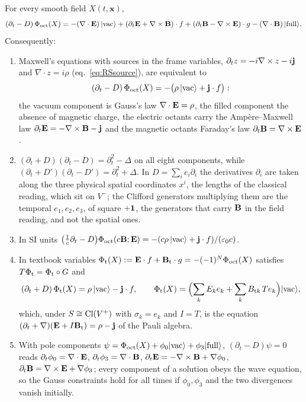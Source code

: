 \begin{theorem}
\label{r3:thm:maxwell}
For every smooth field $X(t,\mathbf x)$,
\begin{equation}
\label{r3:eq:maxwell}
(\partial_t-D)\,\Phi_{\rm oct}(X)=-(\nabla\cdot\mathbf E)\,|\mathrm{vac}\rangle+(\partial_t\mathbf E+\nabla\times\mathbf B)\cdot f+(\partial_t\mathbf B-\nabla\times\mathbf E)\cdot g-(\nabla\cdot\mathbf B)\,|\mathrm{full}\rangle .
\end{equation}
Consequently:
\begin{enumerate}[label=(\roman*),leftmargin=2.2em]
\item Maxwell's equations with sources in the frame variables, $\partial_tz=-i\nabla\times z-i\mathbf j$ and $\nabla\cdot z=i\rho$ (eq.~\cref{eq:RSsource}), are equivalent to
\[
(\partial_t-D)\,\Phi_{\rm oct}(X)=-\bigl(\rho\,|\mathrm{vac}\rangle+\mathbf j\cdot f\bigr):
\]
the vacuum component is Gauss's law $\nabla\cdot\mathbf E=\rho$, the filled component the absence of magnetic charge, the electric octants carry the
Amp\`ere--Maxwell law $\partial_t\mathbf E=-\nabla\times\mathbf B-\mathbf j$ and the magnetic octants Faraday's law $\partial_t\mathbf B=\nabla\times\mathbf E$.
\item $(\partial_t+D)(\partial_t-D)=\partial_t^2-\Delta$ on all eight components, while $(\partial_t+D')(\partial_t-D')=\partial_t^2+\Delta$. In $D=\sum_ie_i\partial_i$ the
derivatives $\partial_i$ are taken along the three physical spatial coordinates $x^i$, the lengths of the classical reading, which sit on $V^-$;
the Clifford generators multiplying them are the temporal $e_1,e_2,e_3$, of square $+\mathbf 1$, the generators that carry $\mathbf B$ in the field reading,
and not the spatial ones.
\item In SI units $\bigl(\tfrac1c\partial_t-D\bigr)\Phi_{\rm oct}(c\mathbf B;\mathbf E)=-(c\rho\,|\mathrm{vac}\rangle+\mathbf j\cdot f)/(\varepsilon_0c)$.
\item In textbook variables $\Phi_{\rm t}(X):=\mathbf E\cdot f+\mathbf B_{\rm t}\cdot g=-(-1)^N\Phi_{\rm oct}(X)$ satisfies $T\Phi_{\rm t}=\Phi_{\rm t}\circ G$ and
\[
(\partial_t+D)\,\Phi_{\rm t}(X)=\rho\,|\mathrm{vac}\rangle-\mathbf j\cdot f,\qquad \Phi_{\rm t}(X)=\Bigl(\sum_kE_ke_k+\sum_kB_{{\rm t}k}\,Te_k\Bigr)|\mathrm{vac}\rangle ,
\]
which, under $S\cong\mathrm{Cl}(V^+)$ with $\sigma_k=e_k$ and $I=T$, is the equation $(\partial_t+\nabla)(\mathbf E+I\mathbf B_{\rm t})=\rho-\mathbf j$ of the Pauli algebra.
\item With pole components $\psi=\Phi_{\rm oct}(X)+\phi_0|\mathrm{vac}\rangle+\phi_3|\mathrm{full}\rangle$, $(\partial_t-D)\psi=0$ reads $\partial_t\phi_0=\nabla\cdot\mathbf E$, $\partial_t\phi_3=\nabla\cdot\mathbf B$,
$\partial_t\mathbf E=-\nabla\times\mathbf B+\nabla\phi_0$, $\partial_t\mathbf B=\nabla\times\mathbf E+\nabla\phi_3$; every component of a solution obeys the wave equation, so the Gauss constraints
hold for all times if $\phi_0,\phi_3$ and the two divergences vanish initially.
\end{enumerate}
\end{theorem}

